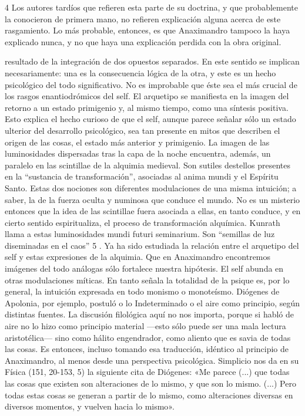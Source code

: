 \documentclass[a4paper]{article}
\begin{document}
4 Los autores tardíos que refieren esta parte de su doctrina, y que
probablemente la conocieron de primera mano, no refieren explicación alguna
acerca de este rasgamiento. Lo más probable, entonces, es que Anaximandro
tampoco la haya explicado nunca, y no que haya una explicación perdida con la
obra original.

resultado de la integración de dos opuestos separados. En este sentido se
implican necesariamente: una es la consecuencia lógica de la otra, y este es un
hecho psicológico del todo significativo. No es improbable que éste sea el más
crucial de los rasgos enantiodrómicos del self. El arquetipo se manifiesta en la
imagen del retorno a un estado primigenio y, al mismo tiempo, como una síntesis
positiva. Esto explica el hecho curioso de que el self, aunque parece señalar
sólo un estado ulterior del desarrollo psicológico, sea tan presente en mitos
que describen el origen de las cosas, el estado más anterior y primigenio. La
imagen de las luminosidades dispersadas tras la capa de la noche encuentra,
además, un paralelo en las scintillae de la alquimia medieval. Son sutiles
destellos presentes en la “sustancia de transformación”, asociadas al anima
mundi y el Espíritu Santo. Estas dos nociones son diferentes modulaciones de una
misma intuición; a saber, la de la fuerza oculta y numinosa que conduce el
mundo. No es un misterio entonces que la idea de las scintillae fuera asociada a
ellas, en tanto conduce, y en cierto sentido espiritualiza, el proceso de
transformación alquímica. Kunrath llama a estas luminosidades mundi futuri
seminarium. Son “semillas de luz diseminadas en el caos” 5 . Ya ha sido
estudiada la relación entre el arquetipo del self y estas expresiones de la
alquimia. Que en Anaximandro encontremos imágenes del todo análogas sólo
fortalece nuestra hipótesis. El self abunda en otras modulaciones míticas. En
tanto señala la totalidad de la psique es, por lo general, la intuición
expresada en todo monismo o monoteísmo. Diógenes de Apolonia, por ejemplo,
postuló o lo Indeterminado o el aire como principio, según distintas fuentes. La
discusión filológica aquí no nos importa, porque si habló de aire no lo hizo
como principio material —esto sólo puede ser una mala lectura aristotélica— sino
como hálito engendrador, como aliento que es savia de todas las cosas. Es
entonces, incluso tomando esa traducción, idéntico al principio de Anaximandro,
al menos desde una perspectiva psicológica. Simplicio nos da en su Física (151,
20-153, 5) la siguiente cita de Diógenes: «Me parece (...) que todas las cosas
que existen son alteraciones de lo mismo, y que son lo mismo. (...) Pero todas
estas cosas se generan a partir de lo mismo, como alteraciones diversas en
diversos momentos, y vuelven hacia lo mismo».
\end{document}
